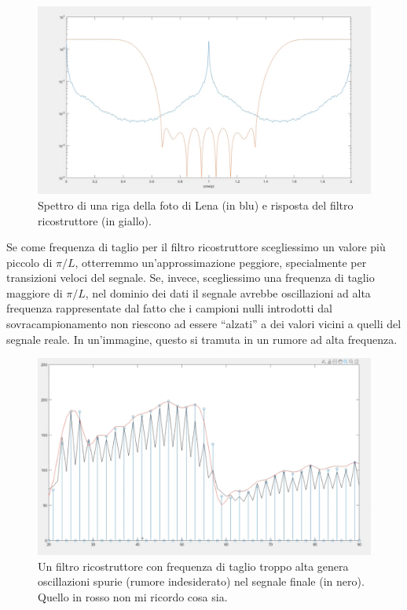 \documentclass[a4paper,11pt]{article}
\begin{document}
\newpage
\renewcommand{\thefigure}{7.2}
\begin{figure}[!h]
  \centering
    \includegraphics[scale=0.25]{images/7/interpolated_lena.png}
    \caption{Spettro di una riga della foto di Lena (in blu) e risposta del filtro ricostruttore (in giallo).}
\end{figure}

Se come frequenza di taglio per il filtro ricostruttore scegliessimo un valore più piccolo di $\pi/L$, otterremmo un'approssimazione peggiore, specialmente
per transizioni veloci del segnale. Se, invece, scegliessimo una frequenza di taglio maggiore di $\pi /L$, nel dominio dei dati il segnale avrebbe oscillazioni
ad alta frequenza rappresentate dal fatto che i campioni nulli introdotti dal sovracampionamento non riescono ad essere ``alzati'' a dei valori vicini a quelli del segnale reale.
In un'immagine, questo si tramuta in un rumore ad alta frequenza.

\renewcommand{\thefigure}{7.3}
\begin{figure}[!h]
  \centering
    \includegraphics[scale=0.25]{images/7/anti_imaging_excessive_cutoff.png}
    \caption{Un filtro ricostruttore con frequenza di taglio troppo alta genera oscillazioni spurie (rumore indesiderato) nel segnale finale (in nero). Quello in rosso non mi ricordo cosa sia.}
\end{figure}
\end{document}
